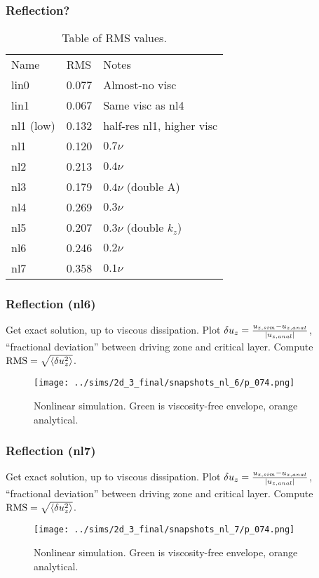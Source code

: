 \documentclass[dvipsnames]{beamer}
\DeclarePairedDelimiter\abs{\lvert}{\rvert}
\DeclarePairedDelimiter\ev{\langle}{\rangle}
\begin{document}
\begin{frame}
    \frametitle{Reflection?}

    \begin{table}[t]
        \centering
        \begin{tabular}{l|l l }
            Name & RMS & Notes\\
            lin0 & 0.077 & Almost-no visc\\
            lin1 & 0.067 & Same visc as nl4\\
            nl1 (low) & 0.132 & half-res nl1, higher visc\\
            nl1 & 0.120 & $0.7\nu$\\
            nl2 & 0.213 & $0.4\nu$\\
            nl3 & 0.179 & $0.4\nu$ (double A)\\
            nl4 & 0.269 & $0.3\nu$\\
            nl5 & 0.207 & $0.3\nu$ (double $k_z$)\\
            nl6 & 0.246 & $0.2\nu$\\
            nl7 & 0.358 & $0.1\nu$
        \end{tabular}
        \caption{Table of RMS values.}
    \end{table}
\end{frame}

\begin{frame}
    \frametitle{Reflection (nl6)}

    Get exact solution, up to viscous dissipation. Plot $\delta u_z =
    \frac{u_{z,sim} - u_{z, anal}}{\abs*{u_{z, anal}}}$, ``fractional
    deviation'' between driving zone and critical layer. Compute $\mathrm{RMS} =
    \sqrt{\ev*{\delta u_z^2}}$.
    \begin{figure}[t]
        \centering
        \texttt{[image: ../sims/2d\_3\_final/snapshots\_nl\_6/p\_074.png]}
        \caption{Nonlinear simulation. Green is viscosity-free envelope, orange
        analytical.}
    \end{figure}
\end{frame}

\begin{frame}
    \frametitle{Reflection (nl7)}

    Get exact solution, up to viscous dissipation. Plot $\delta u_z =
    \frac{u_{z,sim} - u_{z, anal}}{\abs*{u_{z, anal}}}$, ``fractional
    deviation'' between driving zone and critical layer. Compute $\mathrm{RMS} =
    \sqrt{\ev*{\delta u_z^2}}$.
    \begin{figure}[t]
        \centering
        \texttt{[image: ../sims/2d\_3\_final/snapshots\_nl\_7/p\_074.png]}
        \caption{Nonlinear simulation. Green is viscosity-free envelope, orange
        analytical.}
    \end{figure}
\end{frame}
\end{document}
